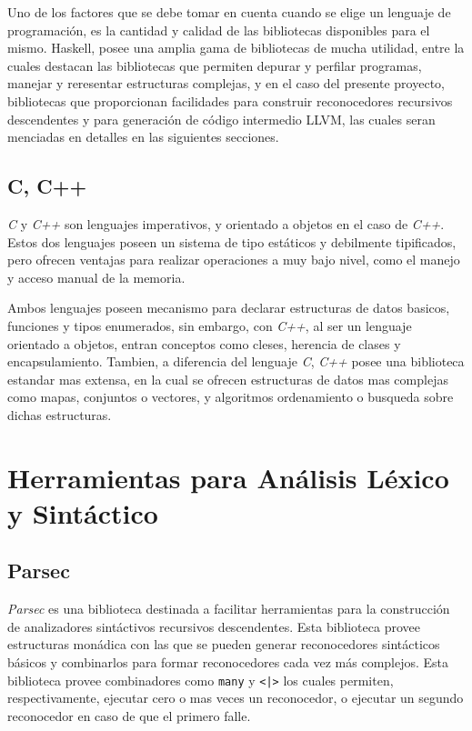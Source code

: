 Uno de los factores que se debe tomar en cuenta cuando se elige un lenguaje de
programación, es la cantidad y calidad de las bibliotecas disponibles para el
mismo. Haskell, posee una amplia gama de bibliotecas de mucha utilidad, entre la
cuales destacan las bibliotecas que permiten depurar y perfilar programas,
manejar y reresentar estructuras complejas, y en el caso del presente
proyecto, bibliotecas que proporcionan facilidades para construir reconocedores
recursivos descendentes y para generación de código intermedio LLVM, las
cuales seran menciadas en detalles en las siguientes secciones.


\subsection{C, C++}
\textit{C} y \textit{C++} son lenguajes imperativos, y orientado a objetos en
el caso de \textit{C++}. Estos dos lenguajes poseen un sistema de tipo
estáticos y debilmente tipificados, pero ofrecen ventajas para realizar
operaciones a muy bajo nivel, como el manejo y acceso manual de la memoria.

Ambos lenguajes poseen mecanismo para declarar estructuras de datos basicos,
funciones y tipos enumerados, sin embargo, con \textit{C++}, al ser un
lenguaje orientado a objetos, entran conceptos como cleses, herencia de clases
y encapsulamiento. Tambien, a diferencia del lenguaje \textit{C}, \textit{C++}
posee una biblioteca estandar mas extensa, en la cual se ofrecen estructuras
de datos mas complejas como mapas, conjuntos o vectores, y algoritmos
ordenamiento o busqueda sobre dichas estructuras.


\section{Herramientas para Análisis Léxico y Sintáctico}

\subsection{Parsec}

\textit{Parsec} es una biblioteca destinada a facilitar herramientas para la
construcción de analizadores sintáctivos recursivos descendentes. Esta
biblioteca provee estructuras monádica con las que se pueden generar
reconocedores sintácticos básicos y combinarlos para formar reconocedores cada
vez más complejos.  Esta biblioteca provee combinadores como \texttt{many} y
\texttt{<|>} los cuales permiten, respectivamente, ejecutar cero o mas veces un
reconocedor, o ejecutar un segundo reconocedor en caso de que el primero falle.

